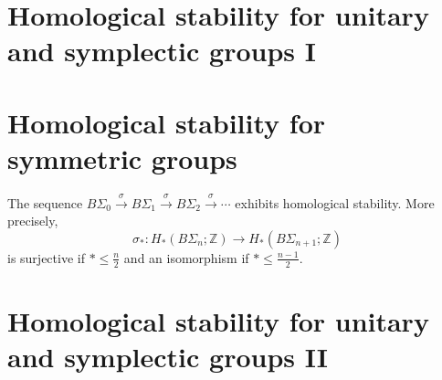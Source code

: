 \chapter{Homological stability for unitary and symplectic groups I}
\cite{mirzaiiHomologyStabilitySymplectic2001,mirzaiiHomologyStabilityUnitary2002a,}


\chapter{Homological stability for symmetric groups}
\cite{kupersHomologicalStabilityMinicourse2021}
\begin{theo}
The sequence $B \Sigma_0 \xrightarrow{\sigma} B \Sigma_1 \xrightarrow{\sigma} B \Sigma_2 \xrightarrow{\sigma} \cdots$ exhibits homological stability. More precisely,
$$
\sigma_*: H_*\left(B \Sigma_n ; \mathbb{Z}\right) \longrightarrow H_*\left(B \Sigma_{n+1} ; \mathbb{Z}\right)
$$
is surjective if $* \leq \frac{n}{2}$ and an isomorphism if $* \leq \frac{n-1}{2}$.
\end{theo}


\chapter{Homological stability for unitary and symplectic groups II}